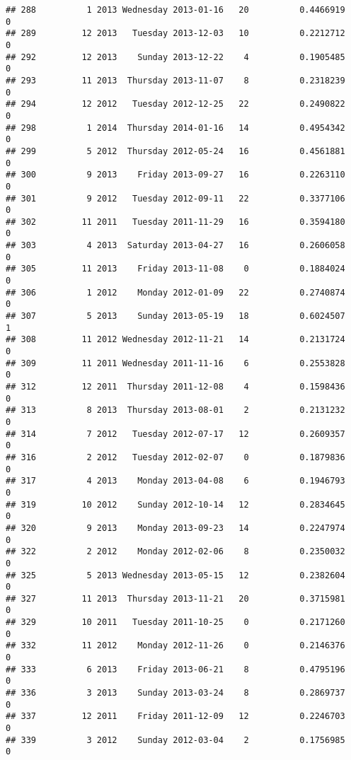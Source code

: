 \documentclass[
]{article}
\begin{document}
\begin{verbatim}
## 288          1 2013 Wednesday 2013-01-16   20          0.4466919             0
## 289         12 2013   Tuesday 2013-12-03   10          0.2212712             0
## 292         12 2013    Sunday 2013-12-22    4          0.1905485             0
## 293         11 2013  Thursday 2013-11-07    8          0.2318239             0
## 294         12 2012   Tuesday 2012-12-25   22          0.2490822             0
## 298          1 2014  Thursday 2014-01-16   14          0.4954342             0
## 299          5 2012  Thursday 2012-05-24   16          0.4561881             0
## 300          9 2013    Friday 2013-09-27   16          0.2263110             0
## 301          9 2012   Tuesday 2012-09-11   22          0.3377106             0
## 302         11 2011   Tuesday 2011-11-29   16          0.3594180             0
## 303          4 2013  Saturday 2013-04-27   16          0.2606058             0
## 305         11 2013    Friday 2013-11-08    0          0.1884024             0
## 306          1 2012    Monday 2012-01-09   22          0.2740874             0
## 307          5 2013    Sunday 2013-05-19   18          0.6024507             1
## 308         11 2012 Wednesday 2012-11-21   14          0.2131724             0
## 309         11 2011 Wednesday 2011-11-16    6          0.2553828             0
## 312         12 2011  Thursday 2011-12-08    4          0.1598436             0
## 313          8 2013  Thursday 2013-08-01    2          0.2131232             0
## 314          7 2012   Tuesday 2012-07-17   12          0.2609357             0
## 316          2 2012   Tuesday 2012-02-07    0          0.1879836             0
## 317          4 2013    Monday 2013-04-08    6          0.1946793             0
## 319         10 2012    Sunday 2012-10-14   12          0.2834645             0
## 320          9 2013    Monday 2013-09-23   14          0.2247974             0
## 322          2 2012    Monday 2012-02-06    8          0.2350032             0
## 325          5 2013 Wednesday 2013-05-15   12          0.2382604             0
## 327         11 2013  Thursday 2013-11-21   20          0.3715981             0
## 329         10 2011   Tuesday 2011-10-25    0          0.2171260             0
## 332         11 2012    Monday 2012-11-26    0          0.2146376             0
## 333          6 2013    Friday 2013-06-21    8          0.4795196             0
## 336          3 2013    Sunday 2013-03-24    8          0.2869737             0
## 337         12 2011    Friday 2011-12-09   12          0.2246703             0
## 339          3 2012    Sunday 2012-03-04    2          0.1756985             0

\end{verbatim}
\end{document}

